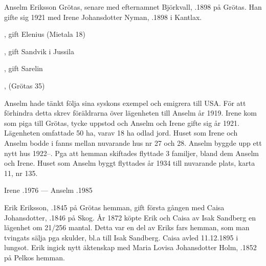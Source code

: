 

Anselm Eriksson Grötas, senare med efternamnet Björkvall, .1898 på Grötas. Han gifte sig 1921 med Irene Johansdotter Nyman, .1898 i Kantlax.
\begin{jhchildren}
  \item {}, gift Elenius (Mietala 18)
  \item {}, gift Sandvik i Jussila
  \item {}, gift Sarelin
  \item {}, (Grötas 35)
\end{jhchildren}

Anselm hade tänkt följa sina syskons exempel och emigrera till USA. För att förhindra detta skrev föräldrarna över lägenheten till Anselm år 1919. Irene kom som piga till Grötas, tycke uppstod och Anselm och Irene gifte sig år 1921. Lägenheten omfattade 50 ha, varav 18 ha odlad jord. Huset som Irene och Anselm bodde i fanns mellan nuvarande hus nr 27 och 28. Anselm byggde upp ett nytt hus 1922--. Pga att hemman skiftades flyttade 3 familjer, bland dem Anselm och Irene. Huset som Anselm byggt flyttades år 1934 till nuvarande plats, karta 11, nr 135.

Irene .1976  ---  Anselm .1985


Erik Eriksson, .1845 på Grötas hemman, gift första gången med Caisa Johansdotter, .1846 på Skog. År 1872 köpte Erik och Caisa av Isak Sandberg en lägenhet om 21/256 mantal. Detta var en del av  Eriks fars hemman, som man tvingats sälja pga  skulder, bl.a till Isak Sandberg. Caisa avled 11.12.1895 i lungsot. Erik ingick nytt äktenskap med Maria Lovisa Johansdotter Holm, .1852 på Pelkos hemman.
\begin{jhchildren}
  \item {}
  \item {}
  \item {}
  \item {}
  \item {}
\end{jhchildren}

